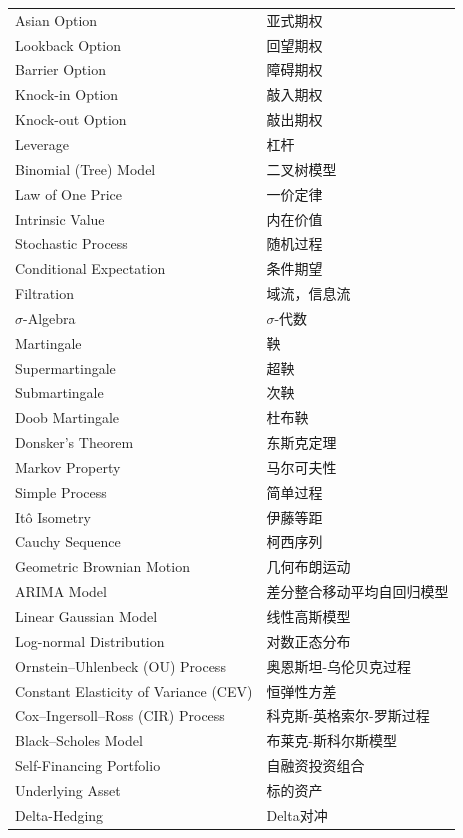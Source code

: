 \begin{longtable}{ll}
    Asian Option & 亚式期权 \\
    Lookback Option & 回望期权 \\
    Barrier Option & 障碍期权 \\
    Knock-in Option & 敲入期权 \\
    Knock-out Option & 敲出期权 \\
    Leverage & 杠杆 \\
    Binomial (Tree) Model & 二叉树模型 \\
    Law of One Price & 一价定律 \\
    Intrinsic Value & 内在价值 \\
    Stochastic Process & 随机过程 \\
    Conditional Expectation & 条件期望 \\
    Filtration & 域流，信息流 \\
    $\sigma$-Algebra & $\sigma$-代数 \\
    Martingale & 鞅 \\
    Supermartingale & 超鞅 \\
    Submartingale & 次鞅 \\
    Doob Martingale & 杜布鞅 \\
    Donsker's Theorem & 东斯克定理 \\
    Markov Property & 马尔可夫性 \\
    Simple Process & 简单过程 \\
    It\^o Isometry & 伊藤等距 \\
    Cauchy Sequence & 柯西序列 \\
    Geometric Brownian Motion & 几何布朗运动 \\
    ARIMA Model & 差分整合移动平均自回归模型 \\
    Linear Gaussian Model & 线性高斯模型 \\
    Log-normal Distribution & 对数正态分布 \\
    Ornstein--Uhlenbeck (OU) Process & 奥恩斯坦-乌伦贝克过程 \\
    Constant Elasticity of Variance (CEV) & 恒弹性方差 \\
    Cox--Ingersoll--Ross (CIR) Process & 科克斯-英格索尔-罗斯过程 \\
    Black--Scholes Model & 布莱克-斯科尔斯模型 \\
    Self-Financing Portfolio & 自融资投资组合 \\
    Underlying Asset & 标的资产 \\
    Delta-Hedging & Delta对冲 \\

\end{longtable}
